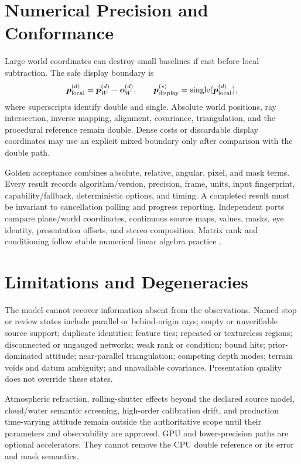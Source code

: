 \documentclass[journal]{IEEEtran}
\begin{document}
\section{Numerical Precision and Conformance}

Large world coordinates can destroy small baselines if cast before local
subtraction. The safe display boundary is
\begin{equation}
\bm p_{\rm local}^{(d)}=\bm p_W^{(d)}-\bm o_W^{(d)},\qquad
\bm p_{\rm display}^{(s)}=\operatorname{single}(\bm p_{\rm local}^{(d)}),
\label{eq:precision}
\end{equation}
where superscripts identify double and single. Absolute world positions, ray
intersection, inverse mapping, alignment, covariance, triangulation, and the
procedural reference remain double. Dense costs or discardable display
coordinates may use an explicit mixed boundary only after comparison with the
double path.

Golden acceptance combines absolute, relative, angular, pixel, and mask terms.
Every result records algorithm/version, precision, frame, units, input
fingerprint, capability/fallback, deterministic options, and timing. A completed
result must be invariant to cancellation polling and progress reporting.
Independent ports compare plane/world coordinates, continuous source maps,
values, masks, eye identity, presentation offsets, and stereo composition.
Matrix rank and conditioning follow stable numerical linear algebra practice
\cite{GolubVanLoan2013}.

\section{Limitations and Degeneracies}

The model cannot recover information absent from the observations. Named stop
or review states include parallel or behind-origin rays; empty or unverifiable
source support; duplicate identities; feature ties; repeated or textureless
regions; disconnected or ungauged networks; weak rank or condition; bound hits;
prior-dominated attitude; near-parallel triangulation; competing depth modes;
terrain voids and datum ambiguity; and unavailable covariance. Presentation
quality does not override these states.

Atmospheric refraction, rolling-shutter effects beyond the declared source
model, cloud/water semantic screening, high-order calibration drift, and
production time-varying attitude remain outside the authoritative scope until
their parameters and observability are approved. GPU and lower-precision paths
are optional accelerators. They cannot remove the CPU double reference or its
error and mask semantics.
\end{document}
